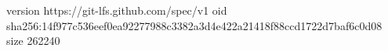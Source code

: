 version https://git-lfs.github.com/spec/v1
oid sha256:14f977c536eef0ea92277988c3382a3d4e422a21418f88ccd1722d7baf6c0d08
size 262240
